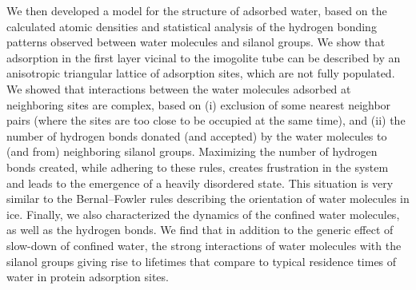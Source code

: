 \documentclass[thesis]{subfiles}
\begin{document}
We then developed a model for the structure of adsorbed water, based on the
calculated atomic densities and statistical analysis of the hydrogen bonding
patterns observed between water molecules and silanol groups. We show that
adsorption in the first layer vicinal to the imogolite tube can be described by
an anisotropic triangular lattice of adsorption sites, which are not fully
populated. We showed that interactions between the water molecules adsorbed at
neighboring sites are complex, based on (i) exclusion of some nearest neighbor
pairs (where the sites are too close to be occupied at the same time), and (ii)
the number of hydrogen bonds donated (and accepted) by the water molecules to
(and from) neighboring silanol groups. Maximizing the number of hydrogen bonds
created, while adhering to these rules, creates frustration in the system and
leads to the emergence of a heavily disordered state. This situation is very
similar to the Bernal--Fowler rules describing the orientation of water
molecules in ice\cite{Bernal1933}. Finally, we also characterized the dynamics
of the confined water molecules, as well as the hydrogen bonds. We find that in
addition to the generic effect of slow-down of confined water, the strong
interactions of water molecules with the silanol groups giving rise to lifetimes
that compare to typical residence times of water in protein adsorption sites.

\OnlyInSubfile{\printbibliography}
\end{document}
